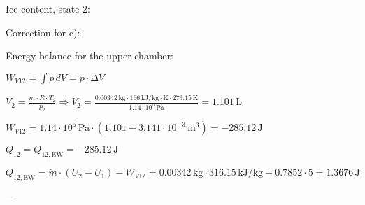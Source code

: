 Ice content, state 2:  

Correction for c):  

Energy balance for the upper chamber:  

\( W_{V12} = \int p \, dV = p \cdot \Delta V \)  

\( V_2 = \frac{m \cdot R \cdot T_2}{p_2} \Rightarrow V_2 = \frac{0.00342 \, \text{kg} \cdot 166 \, \text{kJ/kg} \cdot \text{K} \cdot 273.15 \, \text{K}}{1.14 \cdot 10^5 \, \text{Pa}} = 1.101 \, \text{L} \)  

\( W_{V12} = 1.14 \cdot 10^5 \, \text{Pa} \cdot (1.101 - 3.141 \cdot 10^{-3} \, \text{m}^3) = -285.12 \, \text{J} \)  

\( Q_{12} = Q_{12,\text{EW}} = -285.12 \, \text{J} \)  

\( Q_{12,\text{EW}} = \dot{m} \cdot (U_2 - U_1) - W_{V12} = 0.00342 \, \text{kg} \cdot 316.15 \, \text{kJ/kg} + 0.7852 \cdot 5 = 1.3676 \, \text{J} \)  

---